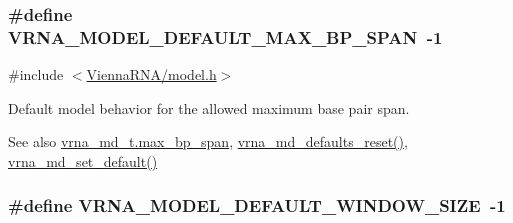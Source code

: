 \subsubsection[{\texorpdfstring{V\+R\+N\+A\+\_\+\+M\+O\+D\+E\+L\+\_\+\+D\+E\+F\+A\+U\+L\+T\+\_\+\+M\+A\+X\+\_\+\+B\+P\+\_\+\+S\+P\+AN}{VRNA_MODEL_DEFAULT_MAX_BP_SPAN}}]{\setlength{\rightskip}{0pt plus 5cm}\#define V\+R\+N\+A\+\_\+\+M\+O\+D\+E\+L\+\_\+\+D\+E\+F\+A\+U\+L\+T\+\_\+\+M\+A\+X\+\_\+\+B\+P\+\_\+\+S\+P\+AN~-\/1}\hypertarget{group__model__details_ga7cb6f4ae8fdebff6746a4410814f2977}{}\label{group__model__details_ga7cb6f4ae8fdebff6746a4410814f2977}


{\ttfamily \#include $<$\hyperlink{model_8h}{Vienna\+R\+N\+A/model.\+h}$>$}



Default model behavior for the allowed maximum base pair span. 

\begin{DoxySeeAlso}{See also}
\hyperlink{structvrna__md__s_a659e5fcc6e8c9f1a68e7de6548eef3b0}{vrna\+\_\+md\+\_\+t.\+max\+\_\+bp\+\_\+span}, \hyperlink{group__model__details_ga70834424cf804d149937de89f80ceb45}{vrna\+\_\+md\+\_\+defaults\+\_\+reset()}, \hyperlink{group__model__details_ga8ac6ff84936282436f822644bf841f66}{vrna\+\_\+md\+\_\+set\+\_\+default()} 
\end{DoxySeeAlso}
\subsubsection[{\texorpdfstring{V\+R\+N\+A\+\_\+\+M\+O\+D\+E\+L\+\_\+\+D\+E\+F\+A\+U\+L\+T\+\_\+\+W\+I\+N\+D\+O\+W\+\_\+\+S\+I\+ZE}{VRNA_MODEL_DEFAULT_WINDOW_SIZE}}]{\setlength{\rightskip}{0pt plus 5cm}\#define V\+R\+N\+A\+\_\+\+M\+O\+D\+E\+L\+\_\+\+D\+E\+F\+A\+U\+L\+T\+\_\+\+W\+I\+N\+D\+O\+W\+\_\+\+S\+I\+ZE~-\/1}\hypertarget{group__model__details_ga8de04a9cb57e811e313b0f9f207f6bdb}{}\label{group__model__details_ga8de04a9cb57e811e313b0f9f207f6bdb}


